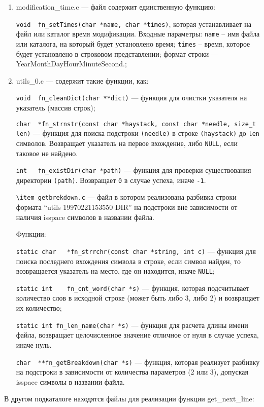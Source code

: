 \begin{enumerate}
	\item  modification\_time.c --- файл содержит единственную функцию: 
	
	\verb|void	fn_setTimes(char *name, char *times)|, которая устанавливает на файл или каталог время модификации. Входные параметры: \verb|name| -- имя файла или каталога, на который будет установлено время; \verb|times| -- время, которое будет установлено в строковом представлении; формат строки --- YearMonthDayHourMinuteSecond.;
	
	\item utils\_0.c --- содержит такие функции, как:
	
	\verb|void	fn_cleanDict(char **dict)| --- функция для очистки указателя на указатель (массив строк);
	
	\verb|char	*fn_strnstr(const char *haystack, const char *needle, size_t len)| --- функция для поиска подстроки \verb|(needle)| в строке \verb|(haystack)| до \verb|len| символов. Возвращает указатель на первое вхождение, либо \verb|NULL|, если таковое не найдено.
	
	\verb|int	fn_existDir(char *path)| --- функция для проверки существования директории \verb|(path)|. Возвращает \verb|0| в случае успеха, иначе \verb|-1|.
	
	\verb|\item getbrekdown.c| --- файл в котором реализована разбивка строки формата ``utils 19970221153550 DIR'' на подстроки вне зависимости от наличия isspace символов в названии файла.
	
	Функции:
	
	\verb|static char	*fn_strrchr(const char *string, int c)| --- функция для поиска последнего вхождения символа в строке, если символ найден, то возвращается указатель на место, где он находится, иначе \verb|NULL|;
	
	\verb|static int	fn_cnt_word(char *s)| --- функция, которая подсчитывает количество слов в исходной строке (может быть либо 3, либо 2) и возвращает их количество;
	
	\verb|static int fn_len_name(char *s)| --- функция для расчета длины имени файла, возвращает целочисленное значение отличное от нуля в случае успеха, иначе нуль.
	
	\verb|char	**fn_getBreakdown(char *s)| --- функция, которая реализует разбивку на подстроки в зависимости от количества параметров (2 или 3), допуская isspace символы в названии файла.
\end{enumerate}
В другом подкаталоге находятся файлы для реализации функции get\_next\_line:
